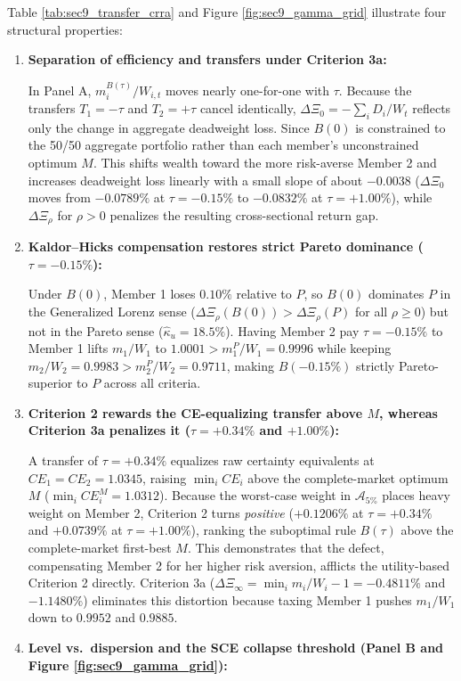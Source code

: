 Table \ref{tab:sec9_transfer_crra} and Figure \ref{fig:sec9_gamma_grid} illustrate four structural properties:
\begin{enumerate}
    \item \textbf{Separation of efficiency and transfers under Criterion 3a:} 
    
    In Panel A, $m_i^{B(\tau)}/W_{i,t}$ moves nearly one-for-one with $\tau$. Because the transfers $T_1 = -\tau$ and $T_2 = +\tau$ cancel identically, $\Delta \Xi_0 = -\sum_i D_i / W_t$ reflects only the change in aggregate deadweight loss. Since $B(0)$ is constrained to the 50/50 aggregate portfolio rather than each member's unconstrained optimum $M$. This shifts wealth toward the more risk-averse Member 2 and increases deadweight loss linearly with a small slope of about $-0.0038$ ($\Delta \Xi_0$ moves from $-0.0789\%$ at $\tau = -0.15\%$ to $-0.0832\%$ at $\tau = +1.00\%$), while $\Delta \Xi_\rho$ for $\rho > 0$ penalizes the resulting cross-sectional return gap.
    \item \textbf{Kaldor--Hicks compensation restores strict Pareto dominance ($\tau = -0.15\%$):} 
    
    Under $B(0)$, Member 1 loses $0.10\%$ relative to $P$, so $B(0)$ dominates $P$ in the Generalized Lorenz sense ($\Delta \Xi_\rho(B(0)) > \Delta \Xi_\rho(P)$ for all $\rho \ge 0$) but not in the Pareto sense ($\hat{\kappa}_u = 18.5\%$). Having Member 2 pay $\tau = -0.15\%$ to Member 1 lifts $m_1/W_1$ to $1.0001 > m_1^P/W_1 = 0.9996$ while keeping $m_2/W_2 = 0.9983 > m_2^P/W_2 = 0.9711$, making $B(-0.15\%)$ strictly Pareto-superior to $P$ across all criteria.
    \item \textbf{Criterion 2 rewards the CE-equalizing transfer above $M$, whereas Criterion 3a penalizes it ($\tau = +0.34\%$ and $+1.00\%$):} 
    
    A transfer of $\tau = +0.34\%$ equalizes raw certainty equivalents at $CE_1 = CE_2 = 1.0345$, raising $\min_i CE_i$ above the complete-market optimum $M$ ($\min_i CE_i^M = 1.0312$). Because the worst-case weight in $\mathcal{A}_{5\%}$ places heavy weight on Member 2, Criterion 2 turns \emph{positive} ($+0.1206\%$ at $\tau = +0.34\%$ and $+0.0739\%$ at $\tau = +1.00\%$), ranking the suboptimal rule $B(\tau)$ above the complete-market first-best $M$. This demonstrates that the \citet{FleurbaeyManiquet2011} defect, compensating Member 2 for her higher risk aversion, afflicts the utility-based Criterion 2 directly. Criterion 3a ($\Delta \Xi_\infty = \min_i m_i/W_i - 1 = -0.4811\%$ and $-1.1480\%$) eliminates this distortion because taxing Member 1 pushes $m_1/W_1$ down to $0.9952$ and $0.9885$.
    \item \textbf{Level vs.\ dispersion and the SCE collapse threshold (Panel B and Figure \ref{fig:sec9_gamma_grid}):} 
    

\end{enumerate}
